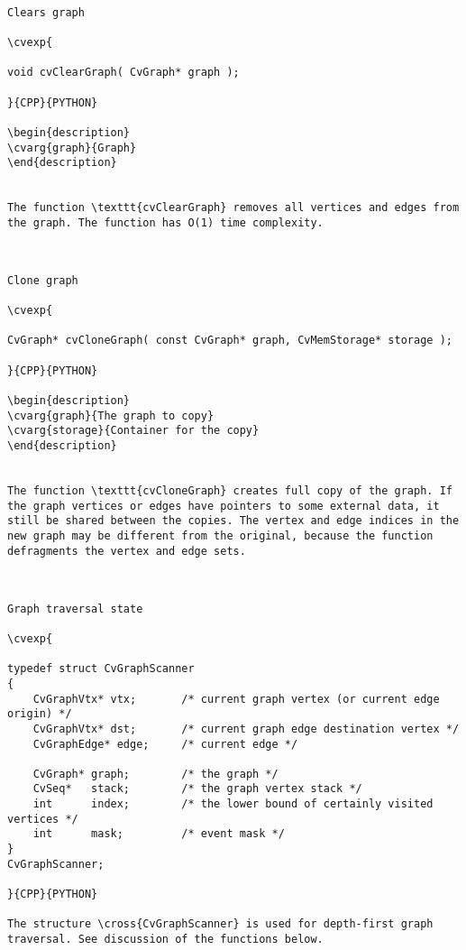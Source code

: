 \begin{verbatim}

Clears graph

\cvexp{

void cvClearGraph( CvGraph* graph );

}{CPP}{PYTHON}

\begin{description}
\cvarg{graph}{Graph}
\end{description}


The function \texttt{cvClearGraph} removes all vertices and edges from the graph. The function has O(1) time complexity.


\end{verbatim}
\begin{verbatim}

Clone graph

\cvexp{

CvGraph* cvCloneGraph( const CvGraph* graph, CvMemStorage* storage );

}{CPP}{PYTHON}

\begin{description}
\cvarg{graph}{The graph to copy}
\cvarg{storage}{Container for the copy}
\end{description}


The function \texttt{cvCloneGraph} creates full copy of the graph. If the graph vertices or edges have pointers to some external data, it still be shared between the copies. The vertex and edge indices in the new graph may be different from the original, because the function defragments the vertex and edge sets.


\end{verbatim}
\begin{verbatim}

Graph traversal state

\cvexp{

typedef struct CvGraphScanner
{
    CvGraphVtx* vtx;       /* current graph vertex (or current edge origin) */
    CvGraphVtx* dst;       /* current graph edge destination vertex */
    CvGraphEdge* edge;     /* current edge */

    CvGraph* graph;        /* the graph */
    CvSeq*   stack;        /* the graph vertex stack */
    int      index;        /* the lower bound of certainly visited vertices */
    int      mask;         /* event mask */
}
CvGraphScanner;

}{CPP}{PYTHON}

The structure \cross{CvGraphScanner} is used for depth-first graph traversal. See discussion of the functions below.


\end{verbatim}
